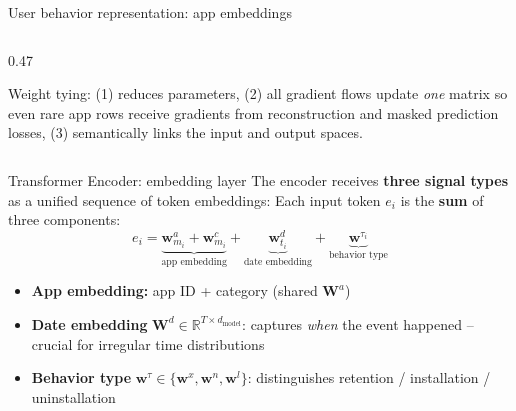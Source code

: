 \documentclass[aspectratio=169,t]{beamer}
\begin{document}
\begin{frame}[shrink=12]{User behavior representation: app embeddings}
\begin{columns}[T]
\begin{column}{0.47\textwidth}
\begin{center}
      \end{center}
      \vspace{0.1cm}
      \footnotesize
      Weight tying: (1) reduces parameters, (2) all gradient flows update \emph{one} matrix so even rare app rows receive gradients from reconstruction and masked prediction losses, (3) semantically links the input and output spaces.
    \end{column}
  \end{columns}
\end{frame}

\begin{frame}{Transformer Encoder: embedding layer}
  The encoder receives \textbf{three signal types} as a unified sequence of token embeddings:
  \vspace{0.2cm}
  Each input token $e_i$ is the \textbf{sum} of three components:
  \[
    e_i = \underbrace{\mathbf{w}^a_{m_i} + \mathbf{w}^c_{m_i}}_{\text{app embedding}}
          + \underbrace{\mathbf{w}^d_{t_i}}_{\text{date embedding}}
          + \underbrace{\mathbf{w}^{\tau_i}}_{\text{behavior type}}
  \]
  \begin{itemize}
    \item \textbf{App embedding:} app ID + category (shared $\mathbf{W}^a$)
    \item \textbf{Date embedding} $\mathbf{W}^d \in \mathbb{R}^{T \times d_\text{model}}$: captures \emph{when} the event happened -- crucial for irregular time distributions
    \item \textbf{Behavior type} $\mathbf{w}^{\tau} \in \{{\mathbf{w}^x, \mathbf{w}^n, \mathbf{w}^l}\}$: distinguishes retention / installation / uninstallation
  \end{itemize}
\end{frame}
\end{document}
